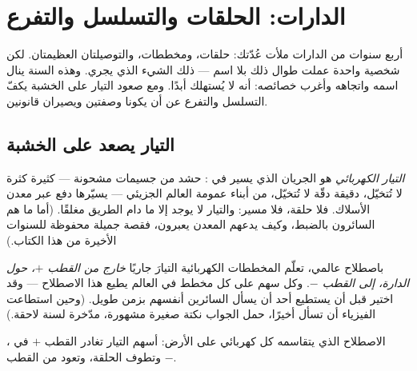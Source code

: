 \chapter{الدارات: الحلقات والتسلسل والتفرع}\label{ch:g7:circuits-series-parallel}

أربع سنوات من الدارات ملأت عُدّتك: حلقات، ومخططات، والتوصيلتان
العظيمتان. لكن شخصية واحدة عملت طوال ذلك بلا اسم --- ذلك الشيء
الذي يجري. وهذه السنة ينال اسمه واتجاهه وأغرب خصائصه: أنه لا
يُستهلك أبدًا. ومع صعود التيار على الخشبة يكفّ التسلسل والتفرع
عن أن يكونا وصفتين ويصيران قانونين.

\section{التيار يصعد على الخشبة}

\begin{definition}\label{def:g7:circuits-series-parallel:current}
\emph{التيار الكهربائي} هو الجريان الذي
يسير في : حشد من جسيمات مشحونة --- كثيرة كثرة لا
تُتخيّل، دقيقة دقّة لا تُتخيّل، من أبناء عمومة العالم الجزيئي
--- يسيّرها دفع  عبر معدن الأسلاك. فلا حلقة، فلا مسير:
والتيار لا يوجد إلا ما دام الطريق مغلقًا. (أما ما هم السائرون
بالضبط، وكيف يدعهم المعدن يعبرون، فقصة جميلة محفوظة للسنوات
الأخيرة من هذا الكتاب.)
\end{definition}

\begin{proposition}\label{prop:g7:circuits-series-parallel:direction}
باصطلاح عالمي، تعلّم المخططات الكهربائية التيارَ جاريًا
\emph{خارج  من القطب $+$، حول الدارة، إلى القطب $-$}.
وكل سهم على كل مخطط في العالم يطيع هذا الاصطلاح --- وقد اختير
قبل أن يستطيع أحد أن يسأل السائرين أنفسهم بزمن طويل. (وحين
استطاعت الفيزياء أن تسأل أخيرًا، حمل الجواب نكتة صغيرة مشهورة،
مدّخرة لسنة لاحقة.)
\end{proposition}

\begin{omfigure}

{\small الاصطلاح الذي يتقاسمه كل كهربائي على الأرض: أسهم التيار
تغادر القطب $+$ في ، وتطوف الحلقة، وتعود من القطب
$-$.}
\end{omfigure}

